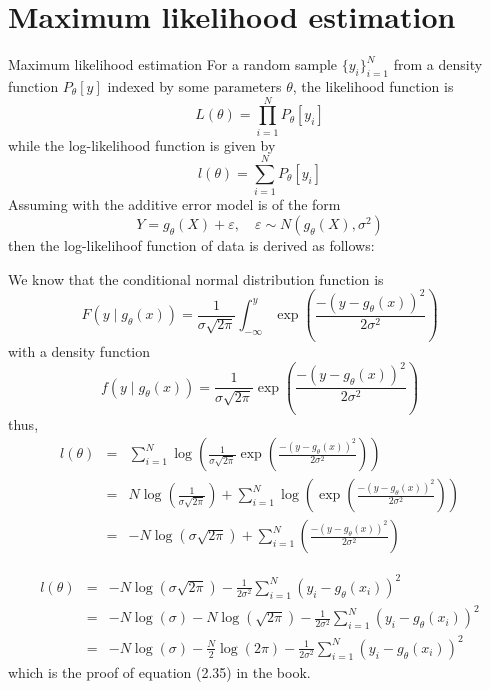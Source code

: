 \documentclass{beamer}
\begin{document}
\section{Maximum likelihood estimation}
\begin{frame}{Maximum likelihood estimation}
For a random sample $\{y_i\}_{i=1}^{N}$ from a density function $P_{\theta}[y]$ indexed by some parameters $\theta$, the likelihood function is
\begin{equation}\label{eq: likelihood}
 L(\theta)=\prod\limits_{i=1}^{N}P_{\theta}[y_i]
\end{equation}
while the log-likelihood function is given by
\begin{equation}\label{eq: log likelihood}
 l(\theta)=\sum\limits_{i=1}^{N}P_{\theta}[y_i]
\end{equation}
Assuming with the additive error model is of the form
\[
Y=g_{\theta}(X)+\varepsilon,\quad \varepsilon\sim N(g_{\theta}(X),\sigma^2)
\]
then the log-likelihoof function of data is derived as follows:
\end{frame}
\begin{frame}
We know that the conditional normal distribution function is
\[
F(y\mid g_{\theta}(x))=\frac{1}{\sigma\sqrt{2\pi}}\int_{-\infty}^{y}\exp\left(\frac{-(y-g_{\theta}(x))^2}{2\sigma^2}\right)
\]
with a density function
\[
f(y\mid g_{\theta}(x))=\frac{1}{\sigma\sqrt{2\pi}}\exp\left(\frac{-(y-g_{\theta}(x))^2}{2\sigma^2}\right)
\]
thus,
\begin{eqnarray*}
l(\theta)&=&\sum\limits_{i=1}^N\log\left(\frac{1}{\sigma\sqrt{2\pi}}\exp\left(\frac{-(y-g_{\theta}(x))^2}{2\sigma^2}\right)\right)\\
&=&N\log\left(\frac{1}{\sigma\sqrt{2\pi}}\right)+\sum\limits_{i=1}^N\log\left(\exp\left(\frac{-(y-g_{\theta}(x))^2}{2\sigma^2}\right)\right)\\
&=&-N\log(\sigma\sqrt{2\pi})+\sum\limits_{i=1}^N\left(\frac{-(y-g_{\theta}(x))^2}{2\sigma^2}\right)
\end{eqnarray*}
\end{frame}
\begin{frame}
\begin{eqnarray*}
l(\theta)&=&-N\log(\sigma\sqrt{2\pi})-\frac{1}{2\sigma^2}\sum\limits_{i=1}^N\left(y_i-g_{\theta}(x_i)\right)^2\\
&=&-N\log(\sigma)-N\log(\sqrt{2\pi})-\frac{1}{2\sigma^2}\sum\limits_{i=1}^N\left(y_i-g_{\theta}(x_i)\right)^2\\
&=&-N\log(\sigma)-\frac{N}{2}\log(2\pi)-\frac{1}{2\sigma^2}\sum\limits_{i=1}^N\left(y_i-g_{\theta}(x_i)\right)^2
\end{eqnarray*}
which is the proof of equation (2.35) in the book.
\end{frame}
%
%
\end{document}
